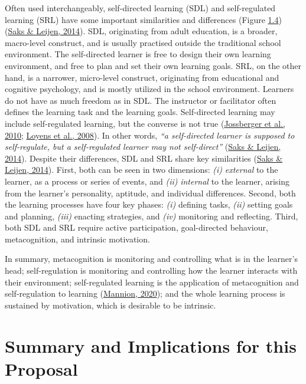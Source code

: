 \documentclass[a4paper, nobind]{templates/ociamthesis}
\begin{document}
Often used interchangeably, self-directed learning (SDL) and
self-regulated learning (SRL) have some important similarities and
differences (Figure \protect\hyperlink{fig_sdl_v_srl}{1.4}) (\protect\hyperlink{ref-saks2014distinguishing}{Saks \& Leijen, 2014}). SDL, originating
from adult education, is a broader, macro-level construct, and is
usually practised outside the traditional school environment. The
self-directed learner is free to design their own learning environment,
and free to plan and set their own learning goals. SRL, on the other
hand, is a narrower, micro-level construct, originating from educational
and cognitive psychology, and is mostly utilized in the school
environment. Learners do not have as much freedom as in SDL. The
instructor or facilitator often defines the learning task and the
learning goals. Self-directed learning may include self-regulated
learning, but the converse is not true
(\protect\hyperlink{ref-jossberger2010challenge}{Jossberger et al., 2010}; \protect\hyperlink{ref-loyens2008selfdirected}{Loyens et al., 2008}). In other words, \emph{``a
self-directed learner is supposed to self-regulate, but a self-regulated
learner may not self-direct''} (\protect\hyperlink{ref-saks2014distinguishing}{Saks \& Leijen, 2014}). Despite their
differences, SDL and SRL share key similarities
(\protect\hyperlink{ref-saks2014distinguishing}{Saks \& Leijen, 2014}). First, both can be seen in two dimensions:
\emph{(i)} \emph{external} to the learner, as a process or series of events, and
\emph{(ii)} \emph{internal} to the learner, arising from the learner's
personality, aptitude, and individual differences. Second, both the
learning processes have four key phases: \emph{(i)} defining tasks, \emph{(ii)}
setting goals and planning, \emph{(iii)} enacting strategies, and \emph{(iv)}
monitoring and reflecting. Third, both SDL and SRL require active
participation, goal-directed behaviour, metacognition, and intrinsic
motivation.

In summary, metacognition is monitoring and controlling what is in the
learner's head; self-regulation is monitoring and controlling how the
learner interacts with their environment; self-regulated learning is the
application of metacognition and self-regulation to learning
(\protect\hyperlink{ref-mannion2020metacognition}{Mannion, 2020}); and the whole learning process is sustained
by motivation, which is desirable to be intrinsic.

\hypertarget{sec:bg_learn_summary}{%
\section{Summary and Implications for this Proposal}\label{sec:bg_learn_summary}}
\end{document}
